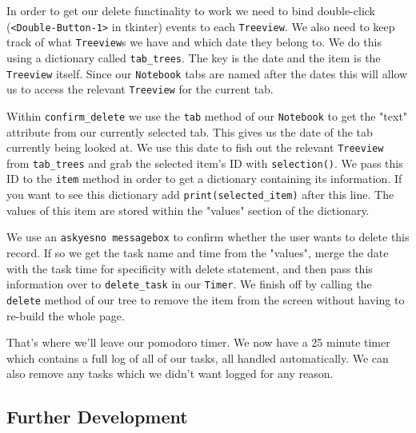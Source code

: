 \documentclass[a4paper,11pt,openany]{book}
\begin{document}
In order to get our delete functinality to work we need to bind double-click (\lstinline[columns=fixed]{<Double-Button-1>} in tkinter) events to each \lstinline[columns=fixed]{Treeview}. We also need to keep track of what \lstinline[columns=fixed]{Treeview}s we have and which date they belong to. We do this using a dictionary called \lstinline[columns=fixed]{tab_trees}. The key is the date and the item is the \lstinline[columns=fixed]{Treeview} itself. Since our \lstinline[columns=fixed]{Notebook} tabs are named after the dates this will allow us to access the relevant \lstinline[columns=fixed]{Treeview} for the current tab. 

\vspace{5mm}

Within \lstinline[columns=fixed]{confirm_delete} we use the \lstinline[columns=fixed]{tab} method of our \lstinline[columns=fixed]{Notebook} to get the "text" attribute from our currently selected tab. This gives us the date of the tab currently being looked at. We use this date to fish out the relevant \lstinline[columns=fixed]{Treeview} from \lstinline[columns=fixed]{tab_trees} and grab the selected item's ID with \lstinline[columns=fixed]{selection()}. We pass this ID to the \lstinline[columns=fixed]{item} method in order to get a dictionary containing its information. If you want to see this dictionary add \lstinline[columns=fixed]{print(selected_item)} after this line. The values of this item are stored within the "values" section of the dictionary. 

\vspace{5mm}

We use an \lstinline[columns=fixed]{askyesno messagebox} to confirm whether the user wants to delete this record. If so we get the task name and time from the "values", merge the date with the task time for specificity with delete statement, and then pass this information over to \lstinline[columns=fixed]{delete_task} in our \lstinline[columns=fixed]{Timer}. We finish off by calling the \lstinline[columns=fixed]{delete} method of our tree to remove the item from the screen without having to re-build the whole page. 

\vspace{5mm}

That's where we'll leave our pomodoro timer. We now have a 25 minute timer which contains a full log of all of our tasks, all handled automatically. We can also remove any tasks which we didn't want logged for any reason.

\subsection{Further Development}
\end{document}
